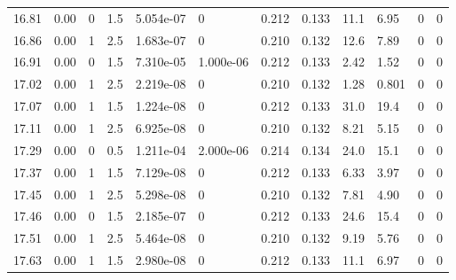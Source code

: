 \documentclass[preview]{standalone}
\begin{document}
{{{{{{\begin{tabular}{L{1.2cm}C{1.2cm} C{0.3cm}C{0.5cm} C{1.4cm}C{1.4cm} C{1.4cm}C{1.4cm} C{1.6cm}C{1.6cm} C{1.6cm}C{1.6cm}}
  16.81  &  0.00  & 0     & 1.5 &  5.054e-07  & 0  &  0.212&   0.133& 11.1 & 6.95   &  0 & 0  \\ 
  16.86  &  0.00  & 1     & 2.5 &  1.683e-07  & 0  &  0.210&   0.132& 12.6 & 7.89   &  0 & 0  \\ 
  16.91  &  0.00  & 0     & 1.5 &  7.310e-05  & 1.000e-06  &  0.212&   0.133& 2.42 & 1.52   &  0 & 0  \\ 
  17.02  &  0.00  & 1     & 2.5 &  2.219e-08  & 0  &  0.210&   0.132& 1.28 & 0.801   &  0 & 0  \\ 
  17.07  &  0.00  & 1     & 1.5 &  1.224e-08  & 0  &  0.212&   0.133& 31.0 & 19.4   &  0 & 0  \\ 
  17.11  &  0.00  & 1     & 2.5 &  6.925e-08  & 0  &  0.210&   0.132& 8.21 & 5.15   &  0 & 0  \\ 
  17.29  &  0.00  & 0     & 0.5 &  1.211e-04  & 2.000e-06  &  0.214&   0.134& 24.0 & 15.1   &  0 & 0  \\ 
  17.37  &  0.00  & 1     & 1.5 &  7.129e-08  & 0  &  0.212&   0.133& 6.33 & 3.97   &  0 & 0  \\ 
  17.45  &  0.00  & 1     & 2.5 &  5.298e-08  & 0  &  0.210&   0.132& 7.81 & 4.90   &  0 & 0  \\ 
  17.46  &  0.00  & 0     & 1.5 &  2.185e-07  & 0  &  0.212&   0.133& 24.6 & 15.4   &  0 & 0  \\ 
  17.51  &  0.00  & 1     & 2.5 &  5.464e-08  & 0  &  0.210&   0.132& 9.19 & 5.76   &  0 & 0  \\ 
  17.63  &  0.00  & 1     & 1.5 &  2.980e-08  & 0  &  0.212&   0.133& 11.1 & 6.97   &  0 & 0  \\ 
\hline 
\end{tabular} 

}}}}}}
\end{document}
